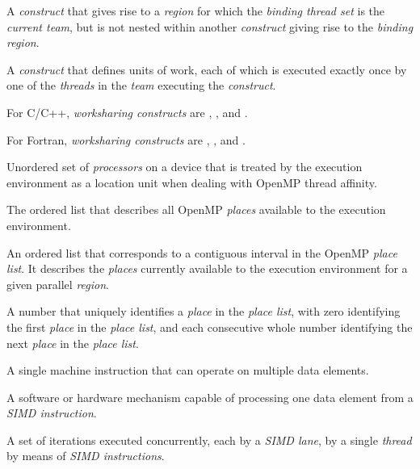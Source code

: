 \glossarydefstart
A \emph{construct} that gives rise to a \emph{region} for which the \emph{binding thread set} is the \emph{current
team}, but is not nested within another \emph{construct} giving rise to the \emph{binding region}.
\glossarydefend

\glossarydefstart
A \emph{construct} that defines units of work, each of which is executed exactly once by
one of the \emph{threads} in the \emph{team} executing the \emph{construct}.

For C/C++, \emph{worksharing constructs} are , , and .

For Fortran, \emph{worksharing constructs} are , ,  and
.
\glossarydefend

{}
\glossarydefstart
Unordered set of \emph{processors} on a device that is treated by the execution environment as a
location unit when dealing with OpenMP thread affinity.
\glossarydefend

\glossarydefstart
The ordered list that describes all OpenMP \emph{places} available to the execution
environment.
\glossarydefend

\glossarydefstart
An ordered list that corresponds to a contiguous interval in the OpenMP \emph{place list}.
It describes the \emph{places} currently available to the execution environment for a given
parallel \emph{region}.
\glossarydefend

\glossarydefstart
A number that uniquely identifies a \emph{place} in the \emph{place list}, with zero identifying the first \emph{place} in the \emph{place list}, and each consecutive whole number identifying the next \emph{place} in the \emph{place list}.
\glossarydefend

\glossarydefstart
A single machine instruction that can operate on multiple data elements.
\glossarydefend

\glossarydefstart
A software or hardware mechanism capable of processing one data element from a
\emph{SIMD instruction}.
\glossarydefend

\glossarydefstart
A set of iterations executed concurrently, each by a \emph{SIMD lane}, by a single \emph{thread}
by means of \emph{SIMD instructions}.
\glossarydefend

